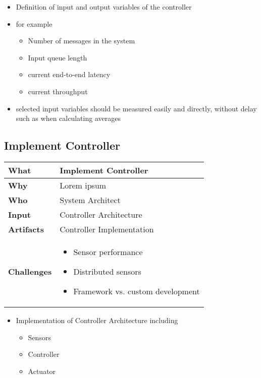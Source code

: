 \begin{itemize}
	\item Definition of input and output variables of the controller
	\item for example
	\begin{itemize}
		\item Number of messages in the system
		\item Input queue length
		\item current end-to-end latency
		\item current throughput
	\end{itemize}
	\item selected input variables should be measured easily and directly, without delay such as when calculating averages
\end{itemize}

\subsection{Implement Controller}
\begin{minipage}{\textwidth}
 \label{table:ch6_Task_Implement_Controller}
\begin{tabular}
	{|m{3cm}|m{10cm}|} \hline \bfseries What & Implement Controller\\
	\hline \bfseries Why & Lorem ipsum\\
	\hline \bfseries Who & System Architect\\
	\hline \bfseries Input & Controller Architecture\\
	\hline \bfseries Artifacts & Controller Implementation\\
	\hline \bfseries Challenges & 
		\begin{itemize}
			\item Sensor performance
			\item Distributed sensors 
			\item Framework vs. custom development
		\end{itemize}\\
	\hline 
\end{tabular}
\end{minipage}

\begin{itemize}
	\item Implementation of Controller Architecture including
	\begin{itemize}
		\item Sensors
		\item Controller
		\item Actuator
	\end{itemize}
\end{itemize}

